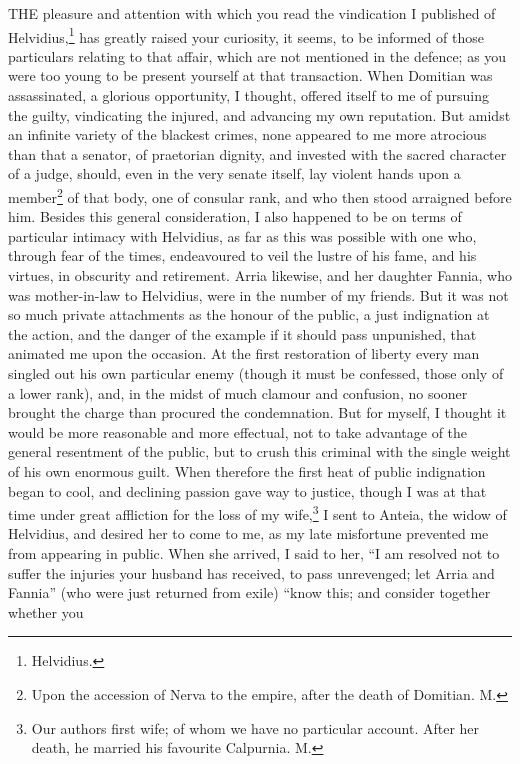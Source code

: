 THE pleasure and attention with which you read the vindication I published
of Helvidius,\footnote{Helvidius.} has greatly raised your curiosity, it
seems, to be informed of those particulars relating to that affair, which
are not mentioned in the defence; as you were too young to be present
yourself at that transaction. When Domitian was assassinated, a glorious
opportunity, I thought, offered itself to me of pursuing the guilty,
vindicating the injured, and advancing my own reputation. But amidst an
infinite variety of the blackest crimes, none appeared to me more
atrocious than that a senator, of praetorian dignity, and invested with
the sacred character of a judge, should, even in the very senate itself,
lay violent hands upon a member\footnote{Upon the accession of
Nerva to the empire, after the death of Domitian. M.} of that body, one of
consular rank, and who then stood arraigned before him. Besides this
general consideration, I also happened to be on terms of particular
intimacy with Helvidius, as far as this was possible with one who, through
fear of the times, endeavoured to veil the lustre of his fame, and his
virtues, in obscurity and retirement. Arria likewise, and her daughter
Fannia, who was mother-in-law to Helvidius, were in the number of my
friends. But it was not so much private attachments as the honour of the
public, a just indignation at the action, and the danger of the example if
it should pass unpunished, that animated me upon the occasion. At the
first restoration of liberty every man singled out his own particular
enemy (though it must be confessed, those only of a lower rank), and, in
the midst of much clamour and confusion, no sooner brought the charge than
procured the condemnation. But for myself, I thought it would be more
reasonable and more effectual, not to take advantage of the general
resentment of the public, but to crush this criminal with the single
weight of his own enormous guilt. When therefore the first heat of public
indignation began to cool, and declining passion gave way to justice,
though I was at that time under great affliction for the loss of my wife,\footnote{Our authors first wife;
of whom we have no particular account. After her death, he married his
favourite Calpurnia. M.}
I sent to Anteia, the widow of Helvidius, and desired her to come to me,
as my late misfortune prevented me from appearing in public. When she
arrived, I said to her, ``I am resolved not to suffer the injuries your
husband has received, to pass unrevenged; let Arria and Fannia'' (who were
just returned from exile) ``know this; and consider together whether you
